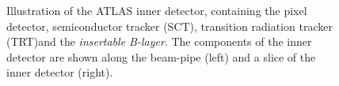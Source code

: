 \begin{figure}[!htpb]
\begin{subfigure}[b]{0.49\textwidth}
        \label{fig:ID2}
    \end{subfigure}
    \caption[Illustration of the ATLAS inner detector]{Illustration of the ATLAS inner detector, containing the pixel detector, semiconductor tracker (SCT), transition radiation tracker (TRT)and the \emph{insertable B-layer}. The components of the inner detector are shown along the beam-pipe (left) and a slice of the inner detector (right).}
    \label{fig:method:ATLAS:ID}
\end{figure}

